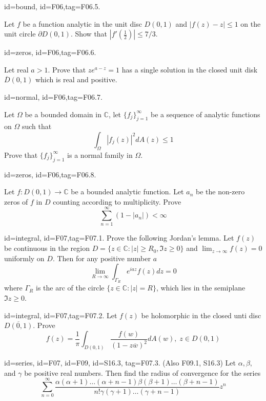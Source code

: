 \documentclass[12pt,letterpaper]{article}
\theoremstyle{plain}
\theoremstyle{definition}
\begin{document}
{\item[id=bound, id=F06,tag=F06.5.]

Let $f$ be a function analytic in the unit disc $D(0,1)$ and $| f(z) - z | \le 1$ on the unit circle $\partial D(0,1)$. Show that $\left| f'(\frac{1}{2}) \right| \le 7/3$.

\item[id=zeros, id=F06,tag=F06.6.]

Let real $a > 1$. Prove that $ze^{a-z} = 1$ has a single solution in the closed unit disk $\overline{D}(0,1)$ which is real and positive.

\item[id=normal, id=F06,tag=F06.7.]

Let $\Omega$ be a bounded domain in $\mathbb{C}$, let $\{f_j\}_{j=1}^{\infty}$ be a sequence of analytic functions on $\Omega$ such that
\[
	\int_{\Omega} | f_j(z) |^2 dA(z) \le 1
\]
Prove that $\{f_j\}_{j=1}^{\infty}$ is a normal family in $\Omega$.

\item[id=zeros, id=F06,tag=F06.8.]

Let $f : D(0,1) \rightarrow \mathbb{C}$ be a bounded analytic function. Let $a_n$ be the non-zero zeros of $f$ in $D$ counting according to multiplicity. Prove
\[
	\sum_{n=1}^{\infty} (1 - | a_n |) < \infty
\]

\item[id=integral, id=F07,tag=F07.1.]
Prove the following Jordan's lemma. Let $f(z)$ be continuous in the region $D = \{z \in \mathbb{C} \colon | z | \ge R_0, \Im z \ge 0 \}$ and $\lim_{z\rightarrow \infty} f(z) = 0$ uniformly on $D$. Then for any positive number $a$
\[
	\lim_{R\rightarrow \infty} \int_{\Gamma_R} e^{iaz} f(z) dz = 0
\]
where $\Gamma_R$ is the arc of the circle $\{z \in \mathbb{C} \colon | z | = R\}$, which lies in the semiplane $\Im z \ge 0$.

\item[id=integral, id=F07,tag=F07.2.]
Let $f(z)$ be holomorphic in the closed unti disc $\overline{D(0,1)}$. Prove
\[
	f(z) = \frac{1}{\pi} \int_{D(0,1)} \frac{f(w)}{(1-z\overline{w})^2} dA(w), \; z \in D(0,1)
\]

\item[id=series, id=F07, id=F09, id=S16.3, tag=F07.3.] (Also F09.1, S16.3)
Let $\alpha, \beta,$ and $\gamma$ be positive real numbers. Then find the radius of convergence for the series
\[
	\sum_{n=0}^{\infty} \frac{\alpha(\alpha + 1)\ldots(\alpha + n - 1)\beta(\beta + 1)\ldots(\beta + n -1)}{n!\gamma(\gamma+1)\ldots(\gamma + n - 1)} z^n
\]

}
\end{document}
